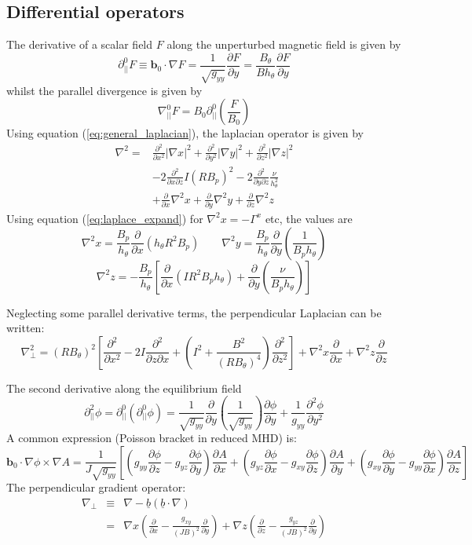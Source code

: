 \documentclass[12pt]{article}
\newcommand{\deriv}[2]{\ensuremath{\frac{\partial #1}{\partial #2}}}
\newcommand{\dderiv}[2]{\ensuremath{\frac{\partial^2 #1}{\partial {#2}^2}}}
\newcommand{\hthe}{\ensuremath{h_\theta}}
\newcommand{\Bp}{\ensuremath{B_\theta}}
\newcommand{\Vec}[1]{\ensuremath{\mathbf{#1}}}
\newcommand{\delp}{\nabla_\perp^2}
\newcommand{\rbp}{\ensuremath{R\Bp}}
\newcommand{\rbpsq}{\ensuremath{\left(\rbp\right)^2}}
\begin{document}
\subsection{Differential operators}

The derivative of a scalar field $F$ along the unperturbed magnetic
field is given by
\[
\partial^0_{||}F \equiv \Vec{b}_0 \cdot\nabla F = \frac{1}{\sqrt{g_{yy}}}\deriv{F}{y} = \frac{\Bp}{B\hthe}\deriv{F}{y}
\]
whilst the parallel divergence is given by
\[
\nabla^0_{||}F = B_0\partial^0_{||}\left(\frac{F}{B_0}\right)
\]
Using equation (\ref{eq:general_laplacian}), the laplacian operator is given by
\begin{eqnarray}
\nabla^2 = &\frac{\partial^2}{\partial x^2}\left|\nabla x\right|^2 + 
\frac{\partial^2}{\partial y^2}\left|\nabla y\right|^2 + 
\frac{\partial^2}{\partial z^2}\left|\nabla z\right|^2 \nonumber \\
&-2\frac{\partial^2}{\partial x\partial z}I\left(RB_p\right)^2 - 2\frac{\partial^2}{\partial y\partial z}\frac{\nu}{h_\theta^2}\\
&+\frac{\partial}{\partial x}\nabla^2x + \frac{\partial}{\partial y}\nabla^2y + \frac{\partial}{\partial z}\nabla^2z \nonumber
\end{eqnarray}
Using equation (\ref{eq:laplace_expand}) for $\nabla^2x = -\Gamma^x$ etc, the values are
\begin{equation}
\nabla^2x = \frac{B_p}{h_\theta}\frac{\partial}{\partial x}\left(h_\theta R^2B_p\right) \qquad
\nabla^2y = \frac{B_p}{h_\theta}\frac{\partial}{\partial y}\left(\frac{1}{B_ph_\theta}\right)
\end{equation}
\[
\nabla^2z = -\frac{B_p}{h_\theta}\left[\frac{\partial}{\partial x}\left(IR^2B_ph_\theta\right) + \frac{\partial}{\partial y}\left(\frac{\nu}{B_ph_\theta}\right)\right]
\]

Neglecting some parallel derivative terms, the perpendicular Laplacian can be written:
\[
\delp = \rbpsq\left[\dderiv{}{x} - 2I\frac{\partial^2}{\partial z\partial x} + \left(I^2 + \frac{B^2}{\left(\rbp\right)^4}\right)\dderiv{}{z}\right] + \nabla^2 x \deriv{}{x} + \nabla^2 z\deriv{}{z} 
\]

The second derivative along the equilibrium field
\[
\partial^2_{||}\phi = \partial^0_{||}\left(\partial^0_{||}\phi\right) = \frac{1}{\sqrt{g_{yy}}}\deriv{}{y}\left(\frac{1}{\sqrt{g_{yy}}}\right)\deriv{\phi}{y} + \frac{1}{g_{yy}}\frac{\partial^2\phi}{\partial y^2}
\]
A common expression (Poisson bracket in reduced MHD) is:
\[
\mathbf{b}_0\cdot\nabla\phi\times\nabla A = \frac{1}{J\sqrt{g_{yy}}}\left[\left(g_{yy}\deriv{\phi}{z} - g_{yz}\deriv{\phi}{y}\right)\deriv{A}{x} + \left(g_{yz}\deriv{\phi}{x} - g_{xy}\deriv{\phi}{z}\right)\deriv{A}{y} + \left(g_{xy}\deriv{\phi}{y} - g_{yy}\deriv{\phi}{x}\right)\deriv{A}{z}\right]
\]
The perpendicular gradient operator:
\begin{eqnarray*}
\nabla_\perp &\equiv& \nabla - \underline{b}\left(\underline{b}\cdot\nabla\right) \\
 &=& \nabla x\left(\deriv{}{x} - \frac{g_{xy}}{\left(JB\right)^2}\deriv{}{y}\right) + \nabla z\left(\deriv{}{z} - \frac{g_{yz}}{\left(JB\right)^2}\deriv{}{y}\right)
\end{eqnarray*}
\end{document}
